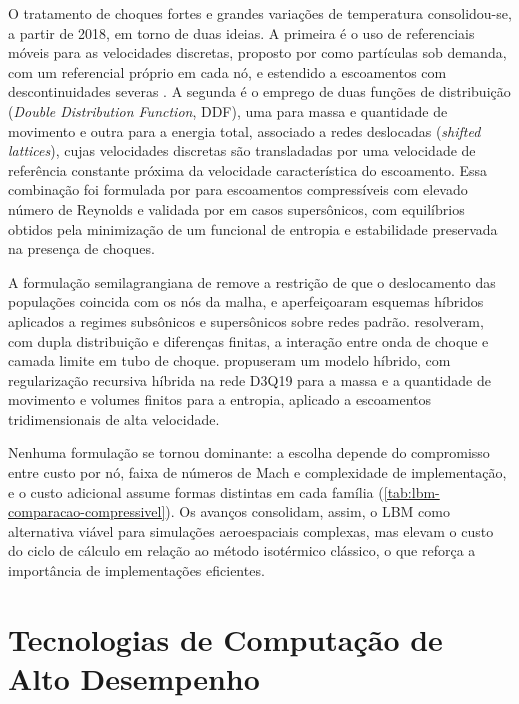 O tratamento de choques fortes e grandes variações de temperatura consolidou-se, a partir de 2018, em torno de duas ideias.
A primeira é o uso de referenciais móveis para as velocidades discretas, proposto por \textcite{Dorschner2018} como partículas sob demanda, com um referencial próprio em cada nó, e estendido a escoamentos com descontinuidades severas \parencite{Kallikounis2022}.
A segunda é o emprego de duas funções de distribuição (\textit{Double Distribution Function}, DDF), uma para massa e quantidade de movimento e outra para a energia total, associado a redes deslocadas (\textit{shifted lattices}), cujas velocidades discretas são transladadas por uma velocidade de referência constante próxima da velocidade característica do escoamento.
Essa combinação foi formulada por \textcite{Tran2022} para escoamentos compressíveis com elevado número de Reynolds e validada por \textcite{Rathnayake2024} em casos supersônicos, com equilíbrios obtidos pela minimização de um funcional de entropia e estabilidade preservada na presença de choques.

A formulação semilagrangiana de \textcite{Wilde2020} remove a restrição de que o deslocamento das populações coincida com os nós da malha, e \textcite{Renard2021} aperfeiçoaram esquemas híbridos aplicados a regimes subsônicos e supersônicos sobre redes padrão.
\textcite{Qiu2020} resolveram, com dupla distribuição e diferenças finitas, a interação entre onda de choque e camada limite em tubo de choque.
\textcite{Guo2020} propuseram um modelo híbrido, com regularização recursiva híbrida na rede D3Q19 para a massa e a quantidade de movimento e volumes finitos para a entropia, aplicado a escoamentos tridimensionais de alta velocidade.

Nenhuma formulação se tornou dominante: a escolha depende do compromisso entre custo por nó, faixa de números de Mach e complexidade de implementação, e o custo adicional assume formas distintas em cada família (\autoref{tab:lbm-comparacao-compressivel}).
Os avanços consolidam, assim, o LBM como alternativa viável para simulações aeroespaciais complexas, mas elevam o custo do ciclo de cálculo em relação ao método isotérmico clássico, o que reforça a importância de implementações eficientes.


\section{Tecnologias de Computação de Alto Desempenho}\label{sec:tecnologias-de-computacao-de-alto-desempenho}

